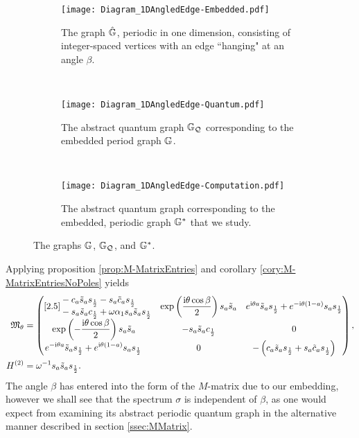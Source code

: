 \begin{figure}[b!]
	\centering
	\begin{subfigure}[t]{0.3\textwidth}
		\centering
		\texttt{[image: Diagram\_1DAngledEdge-Embedded.pdf]}
		\caption[]{\label{fig:Diagram_1DAngledEdge-Embedded} The graph $\hat{\mathbb{G}}$, periodic in one dimension, consisting of integer-spaced vertices with an edge ``hanging" at an angle $\beta$.}
	\end{subfigure}
	~
	\begin{subfigure}[t]{0.3\textwidth}
		\centering
		\texttt{[image: Diagram\_1DAngledEdge-Quantum.pdf]}
		\caption[]{\label{fig:Diagram_1DAngledEdge-Quantum} The abstract quantum graph $\mathbb{G}_{\mathcal{Q}}$ corresponding to the embedded period graph $\mathbb{G}$.}
	\end{subfigure}
	~
	\begin{subfigure}[t]{0.3\textwidth}
		\centering
		\texttt{[image: Diagram\_1DAngledEdge-Computation.pdf]}	
		\caption[]{\label{fig:Diagram_1DAngledEdge-Computation} The abstract quantum graph corresponding to the embedded, periodic graph $\mathbb{G}^*$ that we study.}
	\end{subfigure}
	\caption[The graph and period graph studied in the example of section \ref{ssec:EmbeddingDependentExample}.]{\label{fig:Diagram_1DAngledEdgeExample} The graphs $\mathbb{G}$, $\mathbb{G}_{\mathcal{Q}}$, and $\mathbb{G}^*$.}
\end{figure}

Applying proposition \ref{prop:M-MatrixEntries} and corollary \ref{cory:M-MatrixEntriesNoPoles} yields
\begin{align*} 
	\mathfrak{M}_\theta &=
	\begin{pmatrix}[2.5]
		\begin{split}
			&-c_a \tilde{s}_a s_{\frac{1}{2}} 
			- s_a \tilde{c}_a s_{\frac{1}{2}}  \\
			&- s_a \tilde{s}_a c_{\frac{1}{2}}
			+ \omega\alpha_1 s_a \tilde{s}_a s_{\frac{1}{2}}
		\end{split} &
		\exp\left( \dfrac{\mathrm{i}\theta\cos\beta}{2} \right)s_a \tilde{s}_a &
		e^{\mathrm{i}\theta a}\tilde{s}_a s_{\frac{1}{2}} + e^{-\mathrm{i}\theta(1-a)}s_a s_{\frac{1}{2}} \\
		\begin{split}		
			& \exp\left( -\dfrac{\mathrm{i}\theta\cos\beta}{2} \right)s_a \tilde{s}_a 
		\end{split} &
		-s_a \tilde{s}_a c_{\frac{1}{2}} &
		0 \\
		\begin{split}
			& e^{-\mathrm{i}\theta a}\tilde{s}_a s_{\frac{1}{2}} + e^{\mathrm{i}\theta(1-a)}s_a s_{\frac{1}{2}} 
		\end{split} &
		0 &
		-\left( c_a \tilde{s}_a s_{\frac{1}{2}} + s_a \tilde{c}_a s_{\frac{1}{2}} \right)
	\end{pmatrix}, \\
	H^{(2)} &= \omega^{-1} s_a \tilde{s}_a s_{\frac{1}{2}}.
\end{align*}
The angle $\beta$ has entered into the form of the $M$-matrix due to our embedding, however we shall see that the spectrum $\sigma$ is independent of $\beta$, as one would expect from examining its abstract periodic quantum graph in the alternative manner described in section \ref{ssec:MMatrix}.

